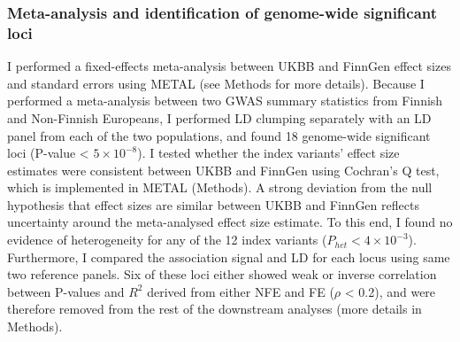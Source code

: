     \subsubsection{Meta-analysis and identification of genome-wide significant loci}
    I performed a fixed-effects meta-analysis between UKBB and FinnGen effect sizes and standard errors using METAL (see Methods for more details). Because I performed a meta-analysis between two GWAS summary statistics from Finnish and Non-Finnish Europeans, I performed LD clumping separately with an LD panel from each of the two populations, and found 18 genome-wide significant loci (P-value < $5\times10^{-8}$). I tested whether the index variants' effect size estimates were consistent between UKBB and FinnGen using Cochran's Q test, which is implemented in METAL (Methods). A strong deviation from the null hypothesis that effect sizes are similar between UKBB and FinnGen reflects uncertainty around the meta-analysed effect size estimate. To this end, I found no evidence of heterogeneity for any of the 12 index variants ($P_{het} < 4\times10^{-3}$). Furthermore, I compared the association signal and LD for each locus using same two reference panels. Six of these loci either showed weak or inverse correlation between P-values and $R^{2}$ derived from either NFE and FE ($\rho$ < 0.2), and were therefore removed from the rest of the downstream analyses (more details in Methods).\\
    


